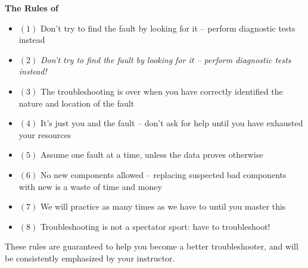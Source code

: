 

\centerline{\bf The Rules of }

\begin{itemize}
\item{$(1)$} Don't try to find the fault by looking for it -- perform diagnostic tests instead
\vskip 10pt
\item{$(2)$} {\it Don't try to find the fault by looking for it -- perform diagnostic tests instead!}
\vskip 10pt
\item{$(3)$} The troubleshooting is over when you have correctly identified the nature and location of the fault
\vskip 10pt
\item{$(4)$} It's just you and the fault -- don't ask for help until you have exhausted your resources
\vskip 10pt
\item{$(5)$} Assume one fault at a time, unless the data proves otherwise
\vskip 10pt
\item{$(6)$} No new components allowed -- replacing suspected bad components with new is a waste of time and money
\vskip 10pt
\item{$(7)$} We will practice as many times as we have to until you master this
\vskip 10pt
\item{$(8)$} Troubleshooting is not a spectator sport:  have to troubleshoot!
\end{itemize}

\vskip 10pt

These rules are guaranteed to help you become a better troubleshooter, and will be consistently emphasized by your instructor.







